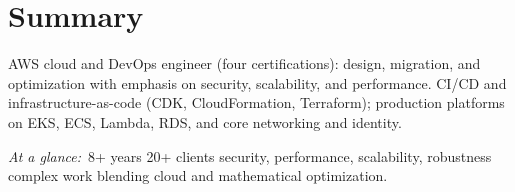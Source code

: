 \section*{Summary}

AWS cloud and DevOps engineer (four certifications): design, migration, and optimization with emphasis on security, scalability, and performance. CI/CD and infrastructure-as-code (CDK, CloudFormation, Terraform); production platforms on EKS, ECS, Lambda, RDS, and core networking and identity.

\smallskip
\noindent\textit{At a glance:}\ 
8+ years \textbullet{} 20+ clients \textbullet{} security, performance, scalability, robustness \textbullet{} complex work blending cloud and mathematical optimization.

